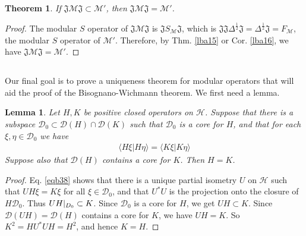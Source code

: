 \documentclass[12pt,b5paper,notitlepage]{article}
\theoremstyle{definition}
\theoremstyle{plain}
\newtheorem{thm}[df]{Theorem}
\newtheorem{lm}[df]{Lemma}
\newcommand{\fk}{\mathfrak}
\newcommand{\mc}{\mathcal}
\newcommand{\Dom}{\scr{D}}
\newcommand{\bk}[1]{\langle {#1}\rangle}
\newcommand{\scr}{\mathscr}
\newcommand{\half}{\frac{1}{2}}
\numberwithin{equation}{section}
\begin{document}
\begin{thm}\label{lb100}
If $\fk J\mc M\fk J\subset\mc M'$, then $\fk J\mc M\fk J=\mc M'$.
\end{thm}

\begin{proof}
The modular $S$ operator of $\fk J\mc M\fk J$ is $\fk J S_{\mc M}\fk J$, which is $\fk J\fk J\Delta^\half\fk J=\Delta^\half\fk J=F_{\mc M}$, the modular $S$ operator of $\mc M'$. 
Therefore, by Thm. \ref{lba15} or Cor. \ref{lba16}, we have $\fk J\mc M\fk J=\mc M'$.
\end{proof}

\subsection{}



Our final goal is to prove a uniqueness theorem for modular operators that will aid the proof of the Bisognano-Wichmann theorem. We first need a lemma.


\begin{lm}\label{lbb25}
Let $H,K$ be positive closed operators on  $\mc H$. Suppose that there is a subspace $\Dom_0\subset\Dom(H)\cap\Dom(K)$ such that $\Dom_0$ is a core for $H$, and that for each $\xi,\eta\in\Dom_0$ we have
\begin{align}\label{eqb38}
\bk{H\xi|H\eta}=\bk{K\xi|K\eta}
\end{align}
Suppose also that $\Dom(H)$ contains a core for $K$. Then $H=K$.
\end{lm}



\begin{proof}
Eq. \eqref{eqb38} shows that there is a unique partial isometry $U$ on $\mc H$ such that $UH\xi=K\xi$ for all $\xi\in\Dom_0$, and that $U^*U$ is the projection onto the closure of $H\Dom_0$. Thus $UH|_{\mc \Dom_0}\subset K$. Since $\Dom_0$ is a core for $H$, we get $UH\subset K$. Since $\Dom(UH)=\Dom(H)$ contains a core for $K$, we have $UH=K$. So $K^2=HU^*UH=H^2$, and hence $K=H$.
\end{proof}


\subsection{}



\end{document}
